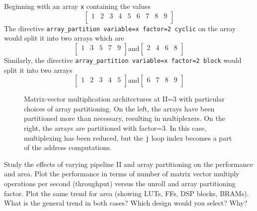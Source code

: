 \begin{aside}
Beginning with an array \lstinline|x| containing the values \[ 
\begin{bmatrix} 
1 & 2 & 3 & 4 & 5 & 6 & 7 & 8 & 9\\
\end{bmatrix}
\]
The directive \lstinline{array_partition variable=x factor=2 cyclic} on the array would split it into two arrays which are 
\[\begin{bmatrix}
1 & 3 & 5 & 7 & 9\\
\end{bmatrix} \text{and} 
\begin{bmatrix}
2 & 4 & 6 & 8 \\
\end{bmatrix}
\]
Similarly, the directive \lstinline{array_partition variable=x factor=2 block} would split it into two arrays
\[\begin{bmatrix}
1 & 2 & 3 & 4 & 5\\
\end{bmatrix} \text{and} 
\begin{bmatrix}
6 & 7 & 8 & 9 \\
\end{bmatrix}
\]
\end{aside}

\begin{figure}

\caption{Matrix-vector multiplication architectures at II=3 with particular choices of array partitioning.  On the left, the arrays have been partitioned more than necessary, resulting in multiplexers.  On the right, the arrays are partitioned with factor=3. In this case, multiplexing has been reduced, but the \lstinline|j| loop index becomes a part of the address computations.}
\label{fig:matrix_vector_partition_factor}
\end{figure}

\begin{exercise}
Study the effects of varying pipeline II and array partitioning on the performance and area. Plot the performance in terms of number of matrix vector multiply operations per second (throughput) versus the unroll and array partitioning factor. Plot the same trend for area (showing LUTs, FFs, DSP blocks, BRAMs). What is the general trend in both cases? Which design would you select? Why?
\end{exercise} 


